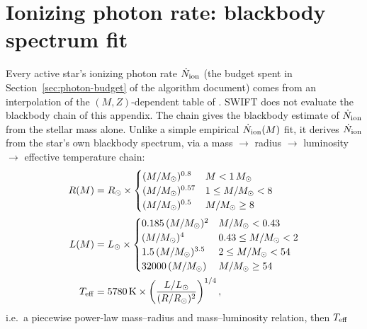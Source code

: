 
\section{Ionizing photon rate: blackbody spectrum fit}
\label{sec:blackbody}

Every active star's ionizing photon rate $\dot N_{\rm ion}$ (the budget
spent in Section~\ref{sec:photon-budget} of the algorithm document)
comes from an interpolation of the
$(M,Z)$-dependent  table of . SWIFT does
not evaluate the blackbody chain of this appendix. The chain gives the
blackbody estimate of $\dot N_{\rm ion}$ from the stellar mass alone.
Unlike a simple empirical
$\dot N_{\rm ion}(M)$ fit, it derives $\dot N_{\rm ion}$ from the
star's own blackbody spectrum, via a mass $\to$ radius $\to$
luminosity $\to$ effective temperature chain:
\begin{align}
  R(M) &= R_\odot \times
  \begin{cases}
    (M/M_\odot)^{0.8} & M < 1\,M_\odot \\
    (M/M_\odot)^{0.57} & 1 \le M/M_\odot < 8 \\
    (M/M_\odot)^{0.5} & M/M_\odot \ge 8
  \end{cases}
  \label{eq:mass-radius} \\
  L(M) &= L_\odot \times
  \begin{cases}
    0.185\,(M/M_\odot)^{2} & M/M_\odot < 0.43 \\
    (M/M_\odot)^{4} & 0.43 \le M/M_\odot < 2 \\
    1.5\,(M/M_\odot)^{3.5} & 2 \le M/M_\odot < 54 \\
    32000\,(M/M_\odot) & M/M_\odot \ge 54
  \end{cases}
  \label{eq:mass-luminosity} \\
  T_{\rm eff} &= 5780\,{\rm K} \times
  \left(\frac{L/L_\odot}{(R/R_\odot)^2}\right)^{1/4},
  \label{eq:stefan-boltzmann}
\end{align}
i.e.\ a piecewise power-law mass--radius and mass--luminosity relation,
then $T_{\rm eff}$
